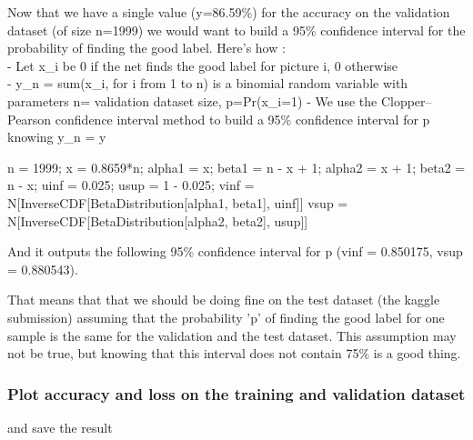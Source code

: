 \documentclass[11pt]{article}
\begin{document}
Now that we have a single value (y=86.59\%) for the accuracy on the
validation dataset (of size n=1999) we would want to build a 95\%
confidence interval for the probability of finding the good label.
Here's how :\\
- Let x\_i be 0 if the net finds the good label for picture i, 0
otherwise\\
- y\_n = sum(x\_i, for i from 1 to n) is a binomial random variable with
parameters n= validation dataset size, p=Pr(x\_i=1) - We use the
Clopper--Pearson confidence interval method to build a 95\% confidence
interval for p knowing y\_n = y

n = 1999; x = 0.8659*n; alpha1 = x; beta1 = n - x + 1; alpha2 = x + 1;
beta2 = n - x; uinf = 0.025; usup = 1 - 0.025; vinf =
N{[}InverseCDF{[}BetaDistribution{[}alpha1, beta1{]}, uinf{]}{]} vsup =
N{[}InverseCDF{[}BetaDistribution{[}alpha2, beta2{]}, usup{]}{]}

And it outputs the following 95\% confidence interval for p (vinf =
0.850175, vsup = 0.880543).

That means that that we should be doing fine on the test dataset (the
kaggle submission) assuming that the probability 'p' of finding the good
label for one sample is the same for the validation and the test
dataset. This assumption may not be true, but knowing that this interval
does not contain 75\% is a good thing.

    \subsubsection{Plot accuracy and loss on the training and validation
dataset}\label{plot-accuracy-and-loss-on-the-training-and-validation-dataset}

and save the result
\end{document}

